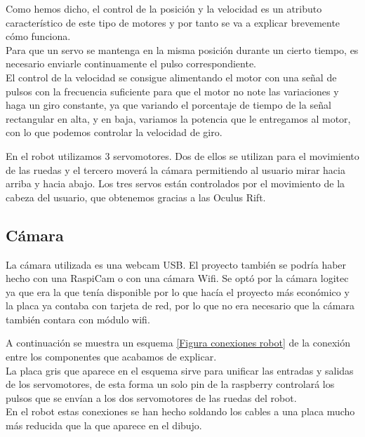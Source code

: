 \documentclass[twoside, 11pt]{epstfg}
\begin{document}
Como hemos dicho, el control de la posición y la velocidad es un atributo característico de este tipo de motores y por tanto se va a explicar brevemente cómo funciona.\\
Para que un servo se mantenga en la misma posición durante un cierto tiempo, es necesario enviarle continuamente el pulso correspondiente.\\
El control de la velocidad se consigue alimentando el motor con una señal de pulsos con la frecuencia suficiente para que el motor no note las variaciones y haga un giro constante, ya que variando el porcentaje de tiempo de la señal rectangular en alta, y en baja, variamos la potencia que le entregamos al motor, con lo que podemos controlar la velocidad de giro.

En el robot utilizamos 3 servomotores.
Dos de ellos se utilizan para el movimiento de las ruedas y el tercero moverá la cámara permitiendo al usuario mirar hacia arriba y hacia abajo.
Los tres servos están controlados por el movimiento de la cabeza del usuario, que obtenemos gracias a las Oculus Rift.

\subsection{Cámara}

La cámara utilizada es una webcam USB. El proyecto también se podría haber hecho con una RaspiCam o con una cámara Wifi. Se optó por la cámara logitec ya que era la que tenía disponible por lo que hacía el proyecto más económico y la placa ya contaba con tarjeta de red, por lo que no era necesario que la cámara también contara con módulo wifi.

A continuación se muestra un esquema \ref{Figura conexiones robot} de la conexión entre los componentes que acabamos de explicar.\\
La placa gris que aparece en el esquema sirve para unificar las entradas y salidas de los servomotores, de esta forma un solo pin de la raspberry controlará los pulsos que se envían a los dos servomotores de las ruedas del robot.\\
En el robot estas conexiones se han hecho soldando los cables a una placa mucho más reducida que la que aparece en el dibujo.
\end{document}
